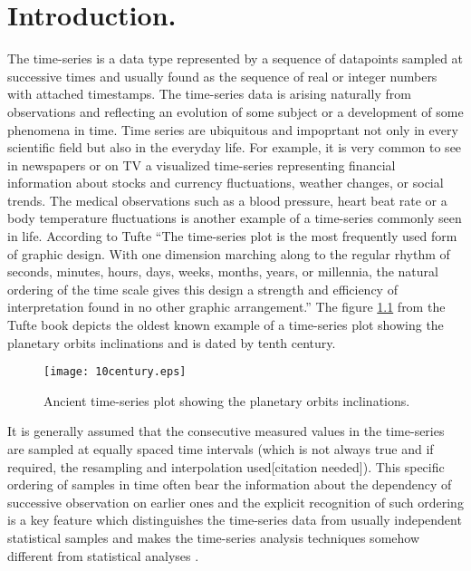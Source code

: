 \chapter{Introduction.}
The time-series is a data type represented by a sequence of datapoints sampled at successive times and usually found as the sequence of real or integer numbers with attached timestamps. The time-series data is arising naturally from observations and reflecting an evolution of some subject or a development of some phenomena in time. Time series are ubiquitous and impoprtant not only in every scientific field but also in the everyday life. For example, it is very common to see in newspapers or on TV a visualized time-series representing financial information about stocks and currency fluctuations, weather changes, or social trends. The medical observations such as a blood pressure, heart beat rate or a body temperature fluctuations is another example of a time-series commonly seen in life. According to Tufte \cite{citeulike:1454223} ``The time-series plot is the most frequently used form of graphic design. With one dimension marching along to the regular rhythm of seconds, minutes, hours, days, weeks, months, years, or millennia, the natural ordering of the time scale gives this design a strength and efficiency of interpretation found in no other graphic arrangement.'' The figure \ref{fig:10century} from the Tufte book depicts the oldest known example of a time-series plot showing the planetary orbits inclinations and is dated by tenth century.

\begin{figure}[tbp]
   \centering
   \texttt{[image: 10century.eps]}
   \caption{Ancient time-series plot showing the planetary orbits inclinations.}
   \label{fig:10century}
\end{figure} 

It is generally assumed that the consecutive measured values in the time-series are sampled at equally spaced time intervals (which is not always true and if required, the resampling and interpolation used[citation needed]). This specific ordering of samples in time often bear the information about the dependency of successive observation on earlier ones and the explicit recognition of such ordering is a key feature which distinguishes the time-series data from usually independent statistical samples and makes the time-series analysis techniques somehow different from statistical analyses \cite{citeulike:3989988}. 

